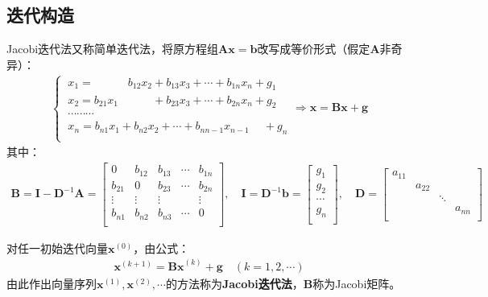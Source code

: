 \subsection{迭代构造}
Jacobi迭代法又称简单迭代法，将原方程组$\boldsymbol{Ax}=\boldsymbol{b}$改写成等价形式（假定$\boldsymbol{A}$非奇异）：
\begin{align}
    \begin{cases}
        \ x_1 = \qquad \quad b_{12}x_2 + b_{13}x_3 + \cdots + b_{1n}x_n + g_1 \\
        \ x_2 = b_{21}x_1 \qquad \quad + b_{23}x_3 + \cdots + b_{2n}x_n + g_2 \\
        \ \cdots \cdots \cdots \\
        \ x_n = b_{n1}x_1  + b_{n2}x_2 + \cdots + b_{nn-1}x_{n-1} \quad \  + g_n \\
    \end{cases} \Rightarrow \boldsymbol{x} = \boldsymbol{Bx} + \boldsymbol{g}
\end{align}
其中：
\begin{align*}
    \boldsymbol{B}=\boldsymbol{I}-\boldsymbol{D}^{-1}\boldsymbol{A}=\begin{bmatrix}
        0      & b_{12} & b_{13}  & \cdots & b_{1n} \\
        b_{21} & 0      & b_{23}  & \cdots & b_{2n} \\
        \vdots & \vdots & \vdots  & \      & \vdots \\
        b_{n1} & b_{n2} & b_{n3}  & \cdots & 0      \\
    \end{bmatrix}, \quad
    \boldsymbol{I} = \boldsymbol{D}^{-1}\boldsymbol{b}=\begin{bmatrix}
        g_1 \\ g_2 \\ \cdots \\ g_n \\
    \end{bmatrix}, \quad
    \boldsymbol{D} = \begin{bmatrix}
        a_{11} & \      & \      & \      \\
        \      & a_{22} & \      & \      \\
        \      &        & \ddots & \      \\
        \      & \      & \      & a_{nn} \\
    \end{bmatrix}
\end{align*}

对任一初始迭代向量$\boldsymbol{x}^{(0)}$，由公式：
\begin{align}
    \boldsymbol{x}^{(k+1)} = \boldsymbol{Bx}^{(k)} + \boldsymbol{g} \quad (k=1,2,\cdots)
\end{align}
由此作出向量序列$\boldsymbol{x}^{(1)},\boldsymbol{x}^{(2)},\cdots$的方法称为\textbf{Jacobi迭代法}，$\boldsymbol{B}$称为Jacobi矩阵。


